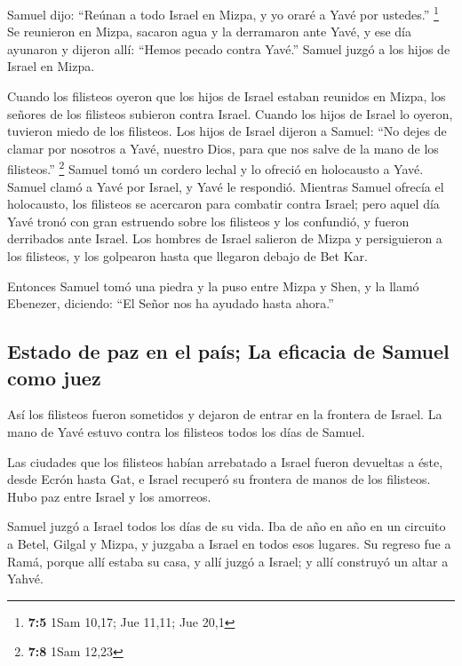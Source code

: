 Samuel dijo: ``Reúnan a todo Israel en Mizpa, y yo oraré
a Yavé por ustedes.'' \footnote{\textbf{7:5} 1Sam 10,17; Jue 11,11; Jue
  20,1}  Se reunieron en Mizpa, sacaron agua y la
derramaron ante Yavé, y ese día ayunaron y dijeron allí: ``Hemos pecado
contra Yavé.'' Samuel juzgó a los hijos de Israel en Mizpa.

 Cuando los filisteos oyeron que los hijos de Israel
estaban reunidos en Mizpa, los señores de los filisteos subieron contra
Israel. Cuando los hijos de Israel lo oyeron, tuvieron miedo de los
filisteos.  Los hijos de Israel dijeron a Samuel: ``No
dejes de clamar por nosotros a Yavé, nuestro Dios, para que nos salve de
la mano de los filisteos.'' \footnote{\textbf{7:8} 1Sam 12,23}
 Samuel tomó un cordero lechal y lo ofreció en holocausto
a Yavé. Samuel clamó a Yavé por Israel, y Yavé le respondió.
 Mientras Samuel ofrecía el holocausto, los filisteos se
acercaron para combatir contra Israel; pero aquel día Yavé tronó con
gran estruendo sobre los filisteos y los confundió, y fueron derribados
ante Israel.  Los hombres de Israel salieron de Mizpa y
persiguieron a los filisteos, y los golpearon hasta que llegaron debajo
de Bet Kar.

 Entonces Samuel tomó una piedra y la puso entre Mizpa y
Shen, y la llamó Ebenezer, diciendo: ``El Señor nos ha ayudado hasta
ahora.''

\hypertarget{estado-de-paz-en-el-pauxeds-la-eficacia-de-samuel-como-juez}{%
\subsection{Estado de paz en el país; La eficacia de Samuel como
juez}\label{estado-de-paz-en-el-pauxeds-la-eficacia-de-samuel-como-juez}}

 Así los filisteos fueron sometidos y dejaron de entrar
en la frontera de Israel. La mano de Yavé estuvo contra los filisteos
todos los días de Samuel.

 Las ciudades que los filisteos habían arrebatado a
Israel fueron devueltas a éste, desde Ecrón hasta Gat, e Israel recuperó
su frontera de manos de los filisteos. Hubo paz entre Israel y los
amorreos.

 Samuel juzgó a Israel todos los días de su vida.
 Iba de año en año en un circuito a Betel, Gilgal y
Mizpa, y juzgaba a Israel en todos esos lugares.  Su
regreso fue a Ramá, porque allí estaba su casa, y allí juzgó a Israel; y
allí construyó un altar a Yahvé.

